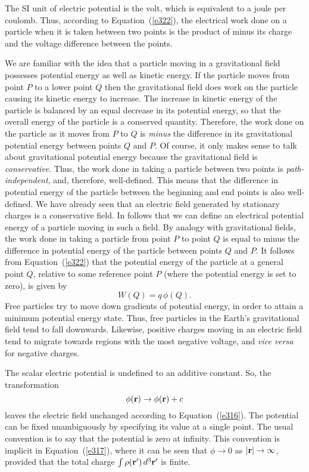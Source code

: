 The SI unit of electric potential is the volt, which is equivalent to a joule
per coulomb. Thus, according to Equation~(\ref{e322}),
 the electrical work done on a particle when it is
taken between two points is the product of minus its charge and the voltage difference 
between the points. 

We  are familiar with the idea that a particle moving in 
a gravitational field possesses  potential energy as well as  kinetic
energy. If the particle moves from  point $P$ to a lower point $Q$ then the
gravitational field does work on the particle causing its kinetic energy to
increase. The increase in kinetic energy of the particle is balanced by an
equal decrease in its potential energy, so that the overall energy of the
particle is a conserved quantity. Therefore, the work done on the particle
as it moves from $P$ to $Q$ is {\em minus}\/ the difference in its gravitational
potential energy between points $Q$ and $P$. Of course, it only makes sense to
talk about gravitational potential energy because the gravitational field
is  {\em conservative}. Thus, the work done in taking a particle between two
points is {\em path-independent}, and, therefore, well-defined. This means that the
difference in potential energy of the particle between the beginning and end 
 points is also
well-defined.
We have already seen that
an electric field generated by stationary charges is a conservative field.
In follows that 
we can define an electrical potential energy of a particle moving in such a field.
By analogy with gravitational fields, the work done in taking a particle 
from point $P$ to point $Q$ is
equal to minus  the difference in  potential energy of the particle between
points $Q$
and $P$.  It follows from Equation~(\ref{e322}) that 
 the potential  energy of the particle at a general
point $Q$, relative to some reference point $P$ (where the potential energy is set to zero), is given by
\begin{equation}
W (Q)= q \,\phi(Q).
\end{equation}
Free particles try to move down gradients of  potential energy, in order to
attain a
minimum potential energy state. Thus, free particles in the Earth's gravitational
field tend to fall downwards.
Likewise, positive charges moving in an electric field
tend to migrate  towards regions with the most negative
voltage, and {\em vice versa}\/ for negative charges. 

The scalar electric potential is undefined to an additive
constant. So, the transformation
\begin{equation}
\phi({\bf r}) \rightarrow \phi({\bf r}) + c
\end{equation}
leaves the electric field unchanged according to Equation~(\ref{e316}).
The potential can be fixed unambiguously
 by specifying its value at a single point. The
usual convention is to say that the potential  is zero at infinity. This convention
is implicit in Equation~(\ref{e317}), where it can be seen that $\phi\rightarrow 0$ as $|{\bf r}|
\rightarrow\infty$, provided that the total charge $\int \rho({\bf r}')\,d^3{\bf r}'$
is finite. 

